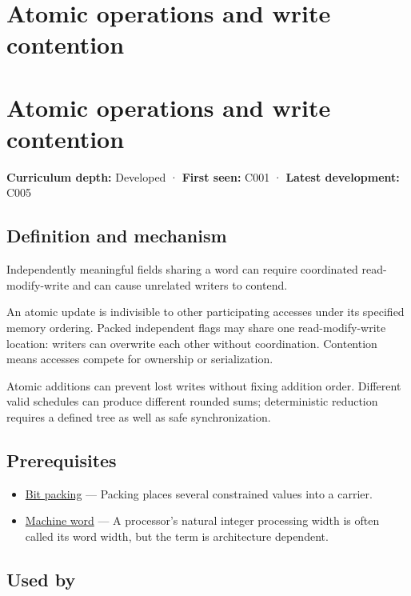 \hypertarget{appendix-e12d1b03fefb}{}
\section*{Atomic operations and write contention}
\section{Atomic operations and write contention}\label{appendix-e12d1b03fefb-atomic-operations-and-write-contention}

\textbf{Curriculum depth:} Developed · \textbf{First seen:} C001 · \textbf{Latest development:} C005

\subsection{Definition and mechanism}\label{appendix-e12d1b03fefb-definition-and-mechanism}

Independently meaningful fields sharing a word can require coordinated read-modify-write and can cause unrelated writers to contend.

An atomic update is indivisible to other participating accesses under its specified memory ordering. Packed independent flags may share one read-modify-write location: writers can overwrite each other without coordination. Contention means accesses compete for ownership or serialization.

Atomic additions can prevent lost writes without fixing addition order. Different valid schedules can produce different rounded sums; deterministic reduction requires a defined tree as well as safe synchronization.

\subsection{Prerequisites}\label{appendix-e12d1b03fefb-prerequisites}

\begin{itemize}
\tightlist
\item
  \hyperref[appendix-1f9963e1a5d1]{Bit packing} --- Packing places several constrained values into a carrier.
\item
  \hyperref[appendix-d67a19507dc5]{Machine word} --- A processor's natural integer processing width is often called its word width, but the term is architecture dependent.
\end{itemize}

\subsection{Used by}\label{appendix-e12d1b03fefb-used-by}

